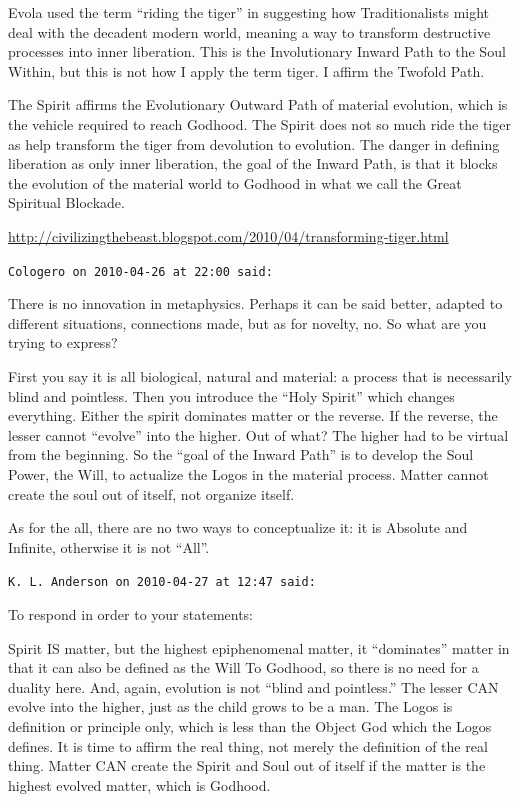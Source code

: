 \begin{footnotesize}
\begin{sffamily}
Evola used the term ``riding the tiger'' in suggesting how Traditionalists might deal with the decadent modern world, meaning a way to transform destructive processes into inner liberation. This is the Involutionary Inward Path to the Soul Within, but this is not how I apply the term tiger. I affirm the Twofold Path.

The Spirit affirms the Evolutionary Outward Path of material evolution, which is the vehicle required to reach Godhood. The Spirit does not so much ride the tiger as help transform the tiger from devolution to evolution. The danger in defining liberation as only inner liberation, the goal of the Inward Path, is that it blocks the evolution of the material world to Godhood in what we call the Great Spiritual Blockade.

\url{http://civilizingthebeast.blogspot.com/2010/04/transforming-tiger.html}


\hfill

\texttt{Cologero on 2010-04-26 at 22:00 said:}

There is no innovation in metaphysics. Perhaps it can be said better, adapted to different situations, connections made, but as for novelty, no. So what are you trying to express?

First you say it is all biological, natural and material: a process that is necessarily blind and pointless. Then you introduce the ``Holy Spirit'' which changes everything. Either the spirit dominates matter or the reverse. If the reverse, the lesser cannot ``evolve'' into the higher. Out of what? The higher had to be virtual from the beginning. So the ``goal of the Inward Path'' is to develop the Soul Power, the Will, to actualize the Logos in the material process. Matter cannot create the soul out of itself, not organize itself.

As for the all, there are no two ways to conceptualize it: it is Absolute and Infinite, otherwise it is not ``All''.

\hfill

\texttt{K. L. Anderson on 2010-04-27 at 12:47 said:}

To respond in order to your statements:

Spirit IS matter, but the highest epiphenomenal matter, it ``dominates'' matter in that it can also be defined as the Will To Godhood, so there is no need for a duality here. And, again, evolution is not ``blind and pointless.'' The lesser CAN evolve into the higher, just as the child grows to be a man. The Logos is definition or principle only, which is less than the Object God which the Logos defines. It is time to affirm the real thing, not merely the definition of the real thing. Matter CAN create the Spirit and Soul out of itself if the matter is the highest evolved matter, which is Godhood.


\end{sffamily}
\end{footnotesize}

